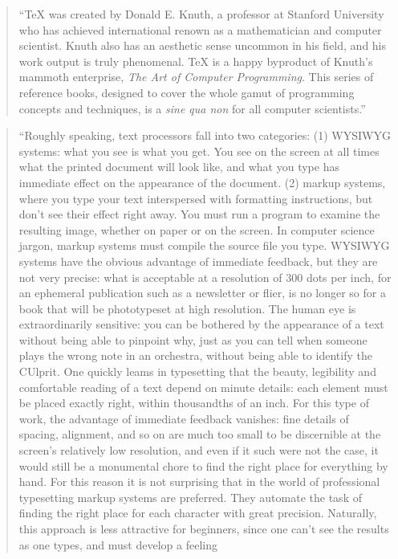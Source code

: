 \documentclass[]{tufte-book}
\begin{document}
\begin{quote}
``TeX was created by Donald E. Knuth, a professor at Stanford University who has
achieved international renown as a mathematician and computer scientist.
Knuth also has an aesthetic sense uncommon in his field, and his work output is
truly phenomenal. TeX is a happy byproduct of Knuth's mammoth enterprise,
\emph{The Art of Computer Programming}. This series of reference books, designed
to cover the whole gamut of programming concepts and techniques, is a
\emph{sine qua non} for all computer scientists.'' \citep{seroul2012beginner}
\end{quote}

\begin{quote}
``Roughly speaking, text processors fall into two categories:
(1) WYSIWYG systems: what you see is what you get. You see on the screen at all
times what the printed document will look like, and what you type has immediate
effect on the appearance of the document. (2) markup systems, where you type your text
interspersed with formatting instructions, but don't see their effect right away. You must run a program to examine the
resulting image, whether on paper or on the screen. In computer science jargon,
markup systems must compile the source file you type. WYSIWYG systems have the obvious
advantage of immediate feedback, but they
are not very precise: what is acceptable at a resolution of 300 dots per inch, for an
ephemeral publication such as a newsletter or flier, is no longer so for a book that
will be phototypeset at high resolution. The human eye is extraordinarily sensitive:
you can be bothered by the appearance of a text without being able to pinpoint why,
just as you can tell when someone plays the wrong note in an orchestra, without
being able to identify the CUlprit. One quickly leams in typesetting that the beauty,
legibility and comfortable reading of a text depend on minute details: each element
must be placed exactly right, within thousandths of an inch. For this type of work,
the advantage of immediate feedback vanishes: fine details of spacing, alignment,
and so on are much too small to be discernible at the screen's relatively low
resolution, and even if it such were not the case, it would still be a monumental chore
to find the right place for everything by hand. For this reason it is not surprising that in the world of professional typesetting
markup systems are preferred. They automate the task of finding the right place
for each character with great precision. Naturally, this approach is less attractive for
beginners, since one can't see the results as one types, and must develop a feeling

\end{quote}
\end{document}
